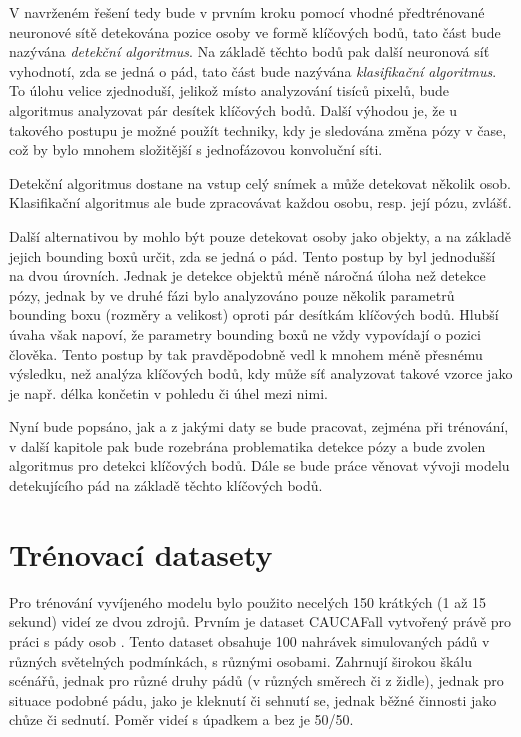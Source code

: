 V navrženém řešení tedy bude v prvním kroku pomocí vhodné předtrénované
neuronové sítě detekována pozice osoby ve formě klíčových bodů, tato část bude
nazývána \textit{detekční algoritmus}. Na základě těchto bodů pak další
neuronová síť vyhodnotí, zda se jedná o pád, tato část bude nazývána
\textit{klasifikační algoritmus}. To úlohu velice zjednoduší, jelikož místo
analyzování tisíců pixelů, bude algoritmus analyzovat pár desítek klíčových
bodů. Další výhodou je, že u takového postupu je možné použít techniky, kdy je
sledována změna pózy v čase, což by bylo mnohem složitější s jednofázovou
konvoluční síti.

Detekční algoritmus dostane na vstup celý snímek a může detekovat několik osob.
Klasifikační algoritmus ale bude zpracovávat každou osobu, resp. její pózu,
zvlášť.

Další alternativou by mohlo být pouze detekovat osoby jako objekty, a na
základě jejich bounding boxů určit, zda se jedná o pád. Tento postup by byl
jednodušší na dvou úrovních. Jednak je detekce objektů méně náročná úloha než
detekce pózy, jednak by ve druhé fázi bylo analyzováno pouze několik parametrů
bounding boxu (rozměry a velikost) oproti pár desítkám klíčových bodů. Hlubší úvaha však napoví, že parametry bounding boxů ne vždy vypovídají o pozici
člověka. Tento postup by tak pravděpodobně vedl k mnohem méně přesnému
výsledku, než analýza klíčových bodů, kdy může síť analyzovat takové vzorce
jako je např. délka končetin v pohledu či úhel mezi nimi.

Nyní bude popsáno, jak a z jakými daty se bude pracovat, zejména při trénování,
v další kapitole pak bude rozebrána problematika detekce pózy a bude zvolen
algoritmus pro detekci klíčových bodů. Dále se bude práce věnovat vývoji modelu
detekujícího pád na základě těchto klíčových bodů.

\section{Trénovací datasety}
\label{sec:TrainingData}

Pro trénování vyvíjeného modelu bylo použito necelých 150 krátkých (1 až 15
sekund) videí ze dvou zdrojů. Prvním je dataset CAUCAFall vytvořený právě pro
práci s pády osob \cite{caucafall}. Tento dataset obsahuje 100 nahrávek
simulovaných pádů v různých světelných podmínkách, s různými osobami. Zahrnují
širokou škálu scénářů, jednak pro různé druhy pádů (v různých směrech či z
židle), jednak pro situace podobné pádu, jako je kleknutí či sehnutí se, jednak
běžné činnosti jako chůze či sednutí. Poměr videí s úpadkem a bez je 50/50.

